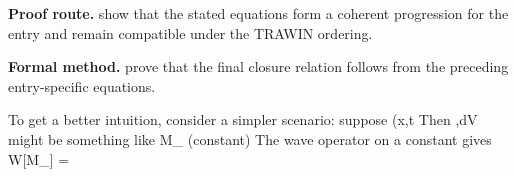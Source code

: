 \textbf{Proof route.} show that the stated equations form a coherent progression for the entry and remain compatible under the TRAWIN ordering.

\textbf{Formal method.} prove that the final closure relation follows from the preceding entry-specific equations.

\medskip
{}

\begin{tzpsnapshot}
\end{tzpsnapshot}

\tzpequationlinks
  {To get a better intuition, consider a simpler scenario: suppose \rho(x,t}
  {Then \int \rho,dV might be something like M_{} (constant)}
  {The wave operator on a constant gives W[M_{}] = \cdots}
